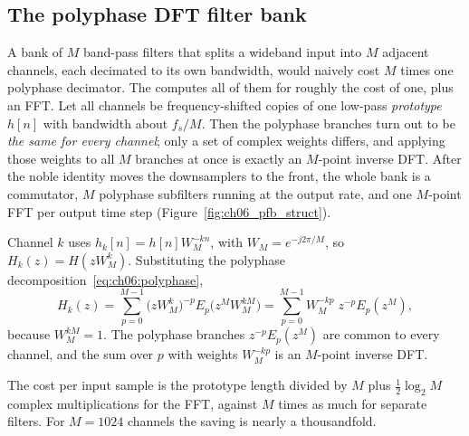 
\subsection{The polyphase DFT filter bank}

A bank of $M$ band-pass filters that splits a wideband input into $M$ adjacent channels, each
decimated to its own bandwidth, would naively cost $M$ times one polyphase decimator. The
 computes all of them for roughly the cost of one, plus an FFT. Let
all channels be frequency-shifted copies of one low-pass \emph{prototype} $h[n]$ with bandwidth
about $f_s/M$. Then the polyphase branches turn out to be \emph{the same for every channel}; only
a set of complex weights differs, and applying those weights to all $M$ branches at once is exactly
an $M$-point inverse DFT. After the noble identity moves the downsamplers to the front, the whole
bank is a commutator, $M$ polyphase subfilters running at the output rate, and one $M$-point FFT per
output time step (Figure~\ref{fig:ch06_pfb_struct}).

\begin{deeper}
Channel $k$ uses $h_k[n]=h[n]W_M^{-kn}$, with $W_M=e^{-j2\pi/M}$, so $H_k(z)=H(zW_M^{k})$.
Substituting the polyphase decomposition~\eqref{eq:ch06:polyphase},
\begin{equation}
H_k(z)=\sum_{p=0}^{M-1}\bigl(zW_M^{k}\bigr)^{-p}E_p\bigl(z^MW_M^{kM}\bigr)
=\sum_{p=0}^{M-1}W_M^{-kp}\;z^{-p}E_p(z^M),
\label{eq:ch06:dftbank}
\end{equation}
because $W_M^{kM}=1$. The polyphase branches $z^{-p}E_p(z^M)$ are common to every channel, and the
sum over $p$ with weights $W_M^{-kp}$ is an $M$-point inverse DFT.
\end{deeper}

The cost per input sample is the prototype length divided by $M$ plus $\tfrac12\log_2M$ complex
multiplications for the FFT, against $M$ times as much for separate filters. For $M=1024$ channels
the saving is nearly a thousandfold.

